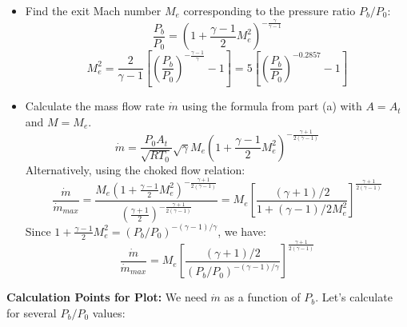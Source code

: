 \begin{enumerate}
  \begin{itemize}
  \tightlist
  \item
    Find the exit Mach number \(M_e\) corresponding to the pressure
    ratio \(P_b/P_0\):
    \[ \frac{P_b}{P_0} = \left( 1 + \frac{\gamma-1}{2} M_e^2 \right)^{-\frac{\gamma}{\gamma-1}} \]
    \[ M_e^2 = \frac{2}{\gamma-1} \left[ \left( \frac{P_b}{P_0} \right)^{-\frac{\gamma-1}{\gamma}} - 1 \right] = 5 \left[ \left( \frac{P_b}{P_0} \right)^{-0.2857} - 1 \right] \]
  \item
    Calculate the mass flow rate \(\dot{m}\) using the formula from part
    (a) with \(A=A_t\) and \(M=M_e\).
    \[ \dot{m} = \frac{P_0 A_t}{\sqrt{R T_0}} \sqrt{\gamma} M_e \left( 1 + \frac{\gamma-1}{2} M_e^2 \right)^{-\frac{\gamma+1}{2(\gamma-1)}} \]
    Alternatively, using the choked flow relation:
    \[ \frac{\dot{m}}{\dot{m}_{max}} = \frac{M_e \left( 1 + \frac{\gamma-1}{2} M_e^2 \right)^{-\frac{\gamma+1}{2(\gamma-1)}}}{ \left( \frac{\gamma+1}{2} \right)^{-\frac{\gamma+1}{2(\gamma-1)}} } = M_e \left[ \frac{(\gamma+1)/2}{1 + (\gamma-1)/2 M_e^2} \right]^{\frac{\gamma+1}{2(\gamma-1)}} \]
    Since
    \(1 + \frac{\gamma-1}{2} M_e^2 = (P_b/P_0)^{-(\gamma-1)/\gamma}\),
    we have:
    \[ \frac{\dot{m}}{\dot{m}_{max}} = M_e \left[ \frac{(\gamma+1)/2}{(P_b/P_0)^{-(\gamma-1)/\gamma}} \right]^{\frac{\gamma+1}{2(\gamma-1)}} \]
  \end{itemize}
\end{enumerate}

\textbf{Calculation Points for Plot:} We need \(\dot{m}\) as a function
of \(P_b\). Let's calculate for several \(P_b/P_0\) values:

